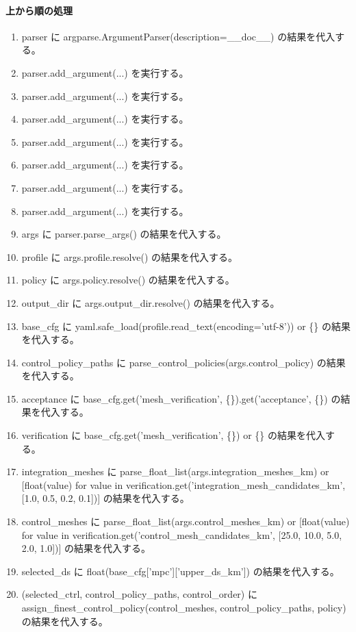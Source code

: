 \documentclass[a4paper,11pt]{article}
\begin{document}
            \paragraph{上から順の処理}
            \begin{enumerate}[leftmargin=1.8em]
            \item parser に argparse.ArgumentParser(description=\_\_doc\_\_) の結果を代入する。
\item parser.add\_argument(...) を実行する。
\item parser.add\_argument(...) を実行する。
\item parser.add\_argument(...) を実行する。
\item parser.add\_argument(...) を実行する。
\item parser.add\_argument(...) を実行する。
\item parser.add\_argument(...) を実行する。
\item parser.add\_argument(...) を実行する。
\item args に parser.parse\_args() の結果を代入する。
\item profile に args.profile.resolve() の結果を代入する。
\item policy に args.policy.resolve() の結果を代入する。
\item output\_dir に args.output\_dir.resolve() の結果を代入する。
\item base\_cfg に yaml.safe\_load(profile.read\_text(encoding='utf-8')) or \{\} の結果を代入する。
\item control\_policy\_paths に parse\_control\_policies(args.control\_policy) の結果を代入する。
\item acceptance に base\_cfg.get('mesh\_verification', \{\}).get('acceptance', \{\}) の結果を代入する。
\item verification に base\_cfg.get('mesh\_verification', \{\}) or \{\} の結果を代入する。
\item integration\_meshes に parse\_float\_list(args.integration\_meshes\_km) or [float(value) for value in verification.get('integration\_mesh\_candidates\_km', [1.0, 0.5, 0.2, 0.1])] の結果を代入する。
\item control\_meshes に parse\_float\_list(args.control\_meshes\_km) or [float(value) for value in verification.get('control\_mesh\_candidates\_km', [25.0, 10.0, 5.0, 2.0, 1.0])] の結果を代入する。
\item selected\_ds に float(base\_cfg['mpc']['upper\_ds\_km']) の結果を代入する。
\item (selected\_ctrl, control\_policy\_paths, control\_order) に assign\_finest\_control\_policy(control\_meshes, control\_policy\_paths, policy) の結果を代入する。

\end{enumerate}
\end{document}
